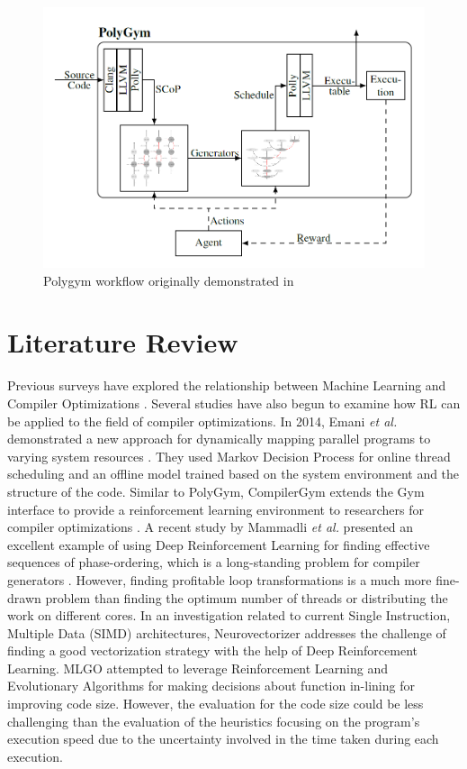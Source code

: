 \documentclass[logo,msc]{infthesis}           %
\begin{document}
\begin{figure}[htbp]
  \centering
  \includegraphics[width=\textwidth]{Images/PolyGym.png}    
  \caption{Polygym workflow originally demonstrated in \cite{P1}}
  \label{fig:polygym}
\end{figure}

\section{Literature Review}

Previous surveys have explored the relationship between Machine Learning and Compiler Optimizations \cite{8357388}\cite{9232934}. Several studies have also begun to examine how RL can be applied to the field of compiler optimizations. In 2014, Emani \textit{et al.} demonstrated a new approach for dynamically mapping parallel programs to varying system resources \cite{10.1007}. They used Markov Decision Process for online thread scheduling and an offline model trained based on the system environment and the structure of the code. Similar to PolyGym, CompilerGym extends the Gym interface to provide a reinforcement learning environment to researchers for compiler optimizations \cite{CompilerGym}. A recent study by Mammadli \textit{et al.} presented an excellent example of using Deep Reinforcement Learning for finding effective sequences of phase-ordering, which is a long-standing problem for compiler generators \cite{static.neural}. However, finding profitable loop transformations is a much more fine-drawn problem than finding the optimum number of threads or distributing the work on different cores. In an investigation related to current Single Instruction, Multiple Data (SIMD) architectures, Neurovectorizer \cite{NeuroVectorizer} addresses the challenge of finding a good vectorization strategy with the help of Deep Reinforcement Learning. MLGO \cite{10.48550} attempted to leverage Reinforcement Learning and Evolutionary Algorithms for making decisions about function in-lining for improving code size. However, the evaluation for the code size could be less challenging than the evaluation of the heuristics focusing on the program's execution speed due to the uncertainty involved in the time taken during each execution.
\end{document}
